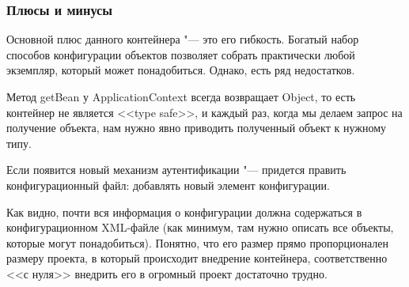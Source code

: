 \subsubsection{Плюсы и минусы}

Основной плюс данного контейнера "--- это его гибкость. Богатый набор способов конфигурации объектов позволяет собрать практически любой экземпляр, который может понадобиться.
Однако, есть ряд недостатков.

Метод getBean у ApplicationContext всегда возвращает Object, то есть контейнер не является <<type safe>>, и каждый раз, когда мы делаем запрос на получение объекта, нам нужно
явно приводить полученный объект к нужному типу.

Если появится новый механизм аутентификации "--- придется править конфигурационный файл: добавлять новый элемент конфигурации.

Как видно, почти вся информация о конфигурации должна содержаться в конфигурационном XML-файле (как минимум, там нужно описать все объекты, которые могут понадобиться).
Понятно, что его размер прямо пропорционален размеру проекта, в который происходит внедрение контейнера, соответственно <<с нуля>> внедрить его в огромный проект достаточно трудно.